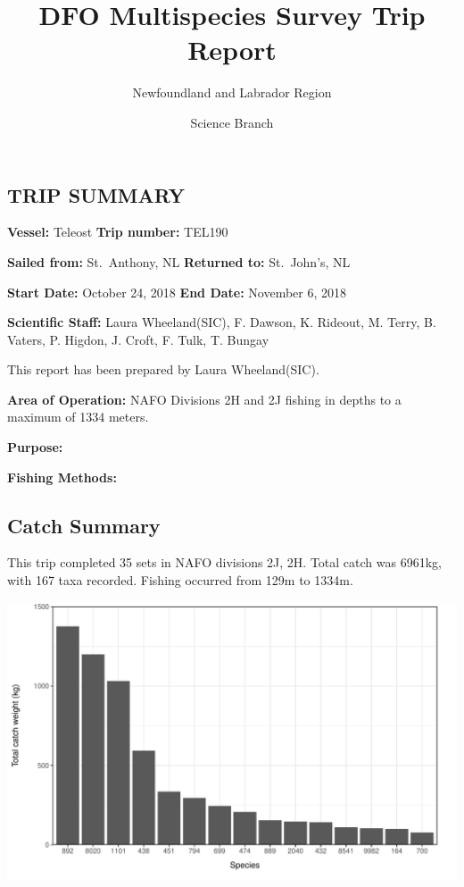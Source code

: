 \documentclass[12pt,]{article}
\title{DFO Multispecies Survey Trip Report}
\subtitle{Newfoundland and Labrador Region}
\author{Science Branch}
\date{}
\begin{document}
\maketitle

\subsection{TRIP SUMMARY}\label{trip-summary}

\textbf{Vessel:} Teleost \textbar{} \textbf{Trip number:} TEL190

\textbf{Sailed from:} St.~Anthony, NL \textbar{} \textbf{Returned to:}
St.~John's, NL

\textbf{Start Date:} October 24, 2018 \textbf{End Date:} November 6,
2018

\textbf{Scientific Staff:} Laura Wheeland(SIC), F. Dawson, K. Rideout,
M. Terry, B. Vaters, P. Higdon, J. Croft, F. Tulk, T. Bungay

This report has been prepared by Laura Wheeland(SIC).

\textbf{Area of Operation:} NAFO Divisions 2H and 2J fishing in depths
to a maximum of 1334 meters.

\textbf{Purpose:}

\textbf{Fishing Methods:}

\subsection{Catch Summary}\label{catch-summary}

This trip completed 35 sets in NAFO divisions 2J, 2H. Total catch was
6961kg, with 167 taxa recorded. Fishing occurred from 129m to 1334m.\\

\begin{center}\includegraphics[width=6in]{knitr-figs/catch.plot-1} \end{center}
\end{document}
